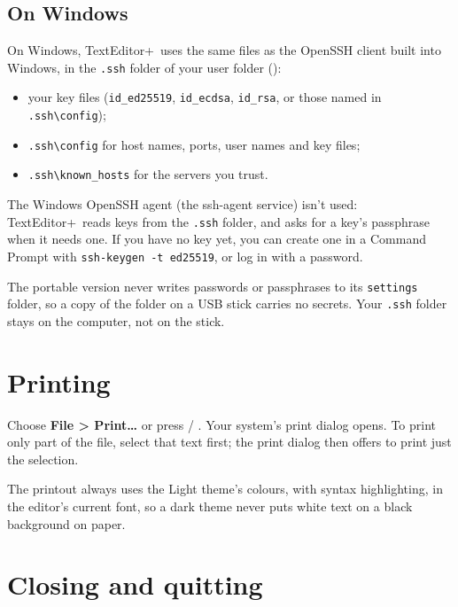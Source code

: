 \documentclass[11pt,a4paper]{article}
\newcommand{\appname}{TextEditor+}
\newcommand{\menu}[1]{\textsf{\textbf{#1}}}
\newcommand{\ui}[1]{\textsf{#1}}
\begin{document}
\subsection{On Windows}\label{sec:sftp-windows}

On Windows, \appname\ uses the same files as the OpenSSH client built into
Windows, in the \texttt{.ssh} folder of your user folder
():

\begin{itemize}
  \item your key files (\texttt{id\_ed25519}, \texttt{id\_ecdsa},
        \texttt{id\_rsa}, or those named in \texttt{.ssh\textbackslash config});
  \item \texttt{.ssh\textbackslash config} for host names, ports, user names
        and key files;
  \item \texttt{.ssh\textbackslash known\_hosts} for the servers you trust.
\end{itemize}

The Windows OpenSSH agent (the \ui{ssh-agent} service) isn't used: \appname\
reads keys from the \texttt{.ssh} folder, and asks for a key's passphrase when
it needs one. If you have no key yet, you can create one in a Command Prompt
with \texttt{ssh-keygen -t ed25519}, or log in with a password.

The portable version never writes passwords or passphrases to its
\texttt{settings} folder, so a copy of the folder on a USB stick carries no
secrets. Your \texttt{.ssh} folder stays on the computer, not on the stick.

\section{Printing}

Choose \menu{File > Print…} or press  / . Your system's
print dialog opens. To print only part of the file, select that text first; the
print dialog then offers to print just the selection.

The printout always uses the Light theme's colours, with syntax highlighting,
in the editor's current font, so a dark theme never puts white text on a black
background on paper.

\section{Closing and quitting}
\end{document}
